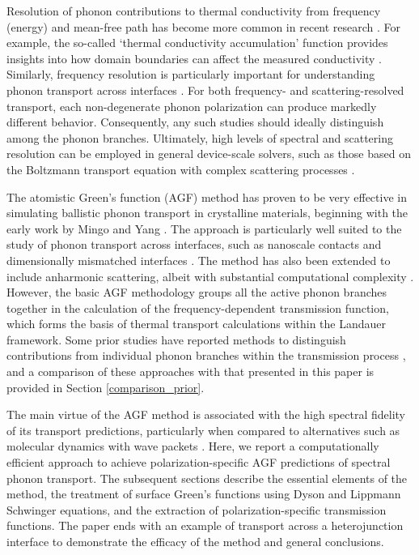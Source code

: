 \documentclass[11pt]{article}
\begin{document}
Resolution of phonon contributions to thermal conductivity from frequency (energy) and mean-free path has become more common in recent research \cite{qiu2012molecular,regner2013broadband}. For example, the so-called `thermal conductivity accumulation' function provides insights into how domain boundaries can affect the measured conductivity \cite{yang2013mean}. Similarly, frequency resolution is particularly important for understanding phonon transport across interfaces \cite{huang2010simulation}. For both frequency- and scattering-resolved transport, each non-degenerate phonon polarization can produce markedly different behavior. Consequently, any such studies should ideally distinguish among the phonon branches. Ultimately, high levels of spectral and scattering resolution can be employed in general device-scale solvers, such as those based on the Boltzmann transport equation with complex scattering processes \cite{minnich2011quasiballistic}. 

The atomistic Green's function (AGF) method has proven to be very effective in simulating ballistic phonon transport in crystalline materials, beginning with the early work by Mingo and Yang \cite{mingo2003phonon}. The approach is particularly well suited to the study of phonon transport across interfaces, such as nanoscale contacts \cite{mingo2009green} and dimensionally mismatched interfaces \cite{huang2010simulation}. The method has also been extended to include anharmonic scattering, albeit with substantial computational complexity \cite{mingo2006anharmonic}. However, the basic AGF methodology groups all the active phonon branches together in the calculation of the frequency-dependent transmission function, which forms the basis of thermal transport calculations within the Landauer framework. Some prior studies have reported methods to distinguish contributions from individual phonon branches within the transmission process \cite{huang2011modeling,ong2015efficient}, and a comparison of these approaches with that presented in this paper is provided in Section \ref{comparison_prior}.  

The main virtue of the AGF method is associated with the high spectral fidelity of its transport predictions, particularly when compared to alternatives such as molecular dynamics with wave packets \cite{schelling2002phonon}. Here, we report a computationally efficient approach to achieve polarization-specific AGF predictions of spectral phonon transport. The subsequent sections describe the essential elements of the method, the  treatment of surface Green's functions using Dyson and Lippmann Schwinger equations, and the extraction of polarization-specific transmission functions. The paper ends with an example of transport across a heterojunction interface to demonstrate the efficacy of the method and general conclusions. 
\end{document}
